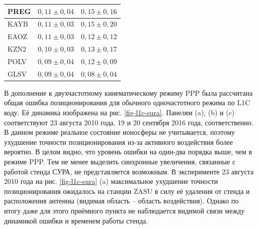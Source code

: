 \begin{longtable}{|>{\centering}p{4cm}|c|c|}
PREG    & $0,11\pm0,04$                                                                                       & $0,15\pm0,16$                                                                                    \\ \hline
KAYB    & $0,11\pm0,03$                                                                                       & $0,15\pm0,20$                                                                                    \\ \hline
EAOZ    & $0,11\pm0,03$                                                                                       & $0,12\pm0,12$                                                                                    \\ \hline
KZN2    & $0,10\pm0,03$                                                                                       & $0,13\pm0,17$                                                                                    \\ \hline
POLV    & $0,09\pm0,04$                                                                                       & $0,12\pm0,09$                                                                                    \\ \hline
GLSV    & $0,09\pm0,04$                                                                                       & $0,08\pm0,04$                                                                                    \\ \hline
\end{longtable}
\endgroup

В дополнение к двухчастотному кинематическому режиму PPP была рассчитана общая ошибка позиционирования для обычного одночастотного режима по L1C коду. 
Её динамика изображена на рис. \ref{fig-l1c-sura}.
Панелям (a), (b) и (c) соответствуют 23 августа 2010 года, 19 и 20 сентября 2016 года, соответственно.
В данном режиме реальное состояние ионосферы не учитывается, поэтому ухудшение точности позиционирования из-за активного воздействия более вероятно. 
В целом видно, что уровень ошибки на один-два порядка выше, чем в режиме PPP.
Тем не менее выделить синхронные увеличения, связанные с работой стенда СУРА, не представляется возможным. 
В эксперименте 23 августа 2010 года на рис. \ref{fig-l1c-sura} (a) максимальное ухудшение точности позиционирования ожидалось на станции ZASU в силу её удаления от стенда и расположения антенны (видимая область -- область воздействия).
Однако по итогу даже для этого приёмного пункта не наблюдается видимой связи между динамикой ошибки и временем работы стенда.

